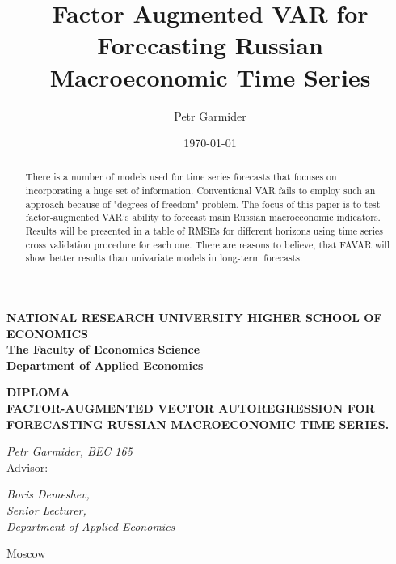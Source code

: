 \documentclass[a4paper, 14pt]{article}
\title{Factor Augmented VAR for Forecasting Russian Macroeconomic Time Series}
\author{Petr Garmider}
\date{\today}
\begin{document}
	\newpage
	\thispagestyle{empty}
	\begin{center}
		
		\vspace{0.1ex}
		
		{\textbf{NATIONAL RESEARCH UNIVERSITY HIGHER SCHOOL OF ECONOMICS}}\\
		\vspace{1ex}
		{\textbf{The Faculty of Economics Science}}\\
		\vspace{1ex}
		{\textbf{
				Department of Applied Economics}}\\
		
	\end{center}
	\vspace{5ex}
	\begin{center}
		\vspace{3ex}
		{\textbf{DIPLOMA}}\\
		\vspace{3ex}
		{
			\vspace{2ex} \textbf{FACTOR-AUGMENTED VECTOR AUTOREGRESSION FOR FORECASTING RUSSIAN MACROECONOMIC TIME SERIES.}}
	\end{center}
	\begin{flushright}
		\vspace{5ex}
		\noindent
		\textit{Petr Garmider, BEC 165}
		\\
		\vspace{5ex}
		Advisor:\\
		\vspace{2ex}
		
		\textit{Boris Demeshev, \\Senior Lecturer, \\Department of Applied Economics}\\
		
		
	\end{flushright}

	\vspace{18ex}
	
	\begin{center}
		\vspace{3ex}
		{Moscow}\\
		\vspace{1ex}{17 April 2020}
	\end{center}	
	
	\newpage
	
\begin{abstract}
	There is a number of models used for time series forecasts that focuses on incorporating a huge set of information. Conventional VAR fails to employ such an approach because of "degrees of freedom" problem. The focus of this paper is to test factor-augmented VAR's ability to forecast main Russian macroeconomic indicators. Results will be presented in a table of RMSEs for different horizons using time series cross validation procedure for each one. There are reasons to believe, that FAVAR will show better results than univariate models in long-term forecasts. 
\end{abstract}
\end{document}

